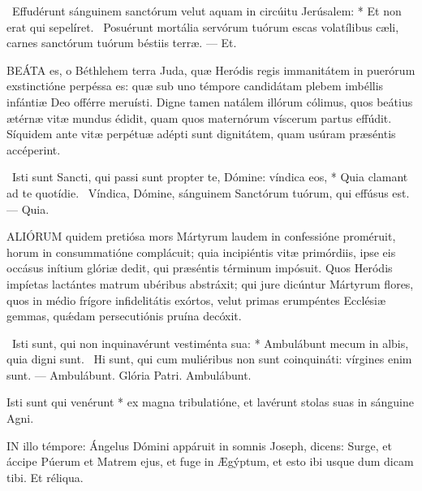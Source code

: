 \R\ Effudérunt sánguinem sanctórum velut aquam in circúitu Jerúsalem: * Et non erat qui sepelíret. \V\ Posuérunt mortália servórum tuórum escas volatílibus cæli, carnes sanctórum tuórum béstiis terræ. --- Et.


\lettrine[lines=2]{B}{EÁTA} es, o Béthlehem terra Juda, quæ Heródis regis immanitátem in puerórum exstinctióne perpéssa es: quæ sub uno témpore candidátam plebem imbéllis infántiæ Deo offérre meruísti. Digne tamen natálem illórum cólimus, quos beátius ætérnæ vitæ mundus édidit, quam quos maternórum víscerum partus effúdit. Síquidem ante vitæ perpétuæ adépti sunt dignitátem, quam usúram præséntis accéperint.

\R\ Isti sunt Sancti, qui passi sunt propter te, Dómine: víndica eos, * Quia clamant ad te quotídie. \V\ Víndica, Dómine, sánguinem Sanctórum tuórum, qui effúsus est. --- Quia.


\lettrine[lines=2]{A}{LIÓRUM} quidem pretiósa mors Mártyrum laudem in confessióne proméruit, horum in consummatióne complácuit; quia incipiéntis vitæ primórdiis, ipse eis occásus inítium glóriæ dedit, qui præséntis términum impósuit. Quos Heródis impíetas lactántes matrum ubéribus abstráxit; qui jure dicúntur Mártyrum flores, quos in médio frígore infidelitátis exórtos, velut primas erumpéntes Ecclésiæ gemmas, quǽdam persecutiónis pruína decóxit.

\R\ Isti sunt, qui non inquinavérunt vestiménta sua: * Ambulábunt mecum in albis, quia digni sunt. \V\ Hi sunt, qui cum muliéribus non sunt coinquináti: vírgines enim sunt. --- Ambulábunt. Glória Patri. Ambulábunt.



 Isti sunt qui venérunt * ex magna tribulatióne, et lavérunt stolas suas in sánguine Agni.



\lettrine[lines=2]{I}{N} illo témpore: Ángelus Dómini appáruit in somnis Joseph, dicens: Surge, et áccipe Púerum et Matrem ejus, et fuge in Ægýptum, et esto ibi usque dum dicam tibi. Et réliqua.


